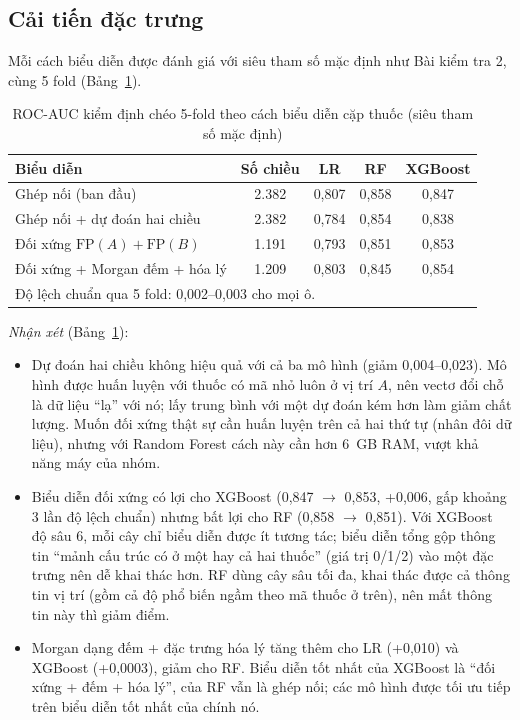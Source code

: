 \documentclass[12pt,a4paper,oneside]{report}
\begin{document}
\subsection{Cải tiến đặc trưng}
Mỗi cách biểu diễn được đánh giá với siêu tham số mặc định như Bài kiểm tra 2, cùng
5 fold (Bảng~\ref{tab:caitiendactrung}).

\begin{table}[H]
  \centering
  \caption{ROC-AUC kiểm định chéo 5-fold theo cách biểu diễn cặp thuốc (siêu tham số mặc định)}
  \label{tab:caitiendactrung}
  \small
  \begin{tabular}{lcccc}
    \toprule
    \textbf{Biểu diễn} & \textbf{Số chiều} & \textbf{LR} & \textbf{RF} & \textbf{XGBoost} \\
    \midrule
    Ghép nối (ban đầu) & 2.382 & 0,807 & 0,858 & 0,847 \\
    Ghép nối + dự đoán hai chiều & 2.382 & 0,784 & 0,854 & 0,838 \\
    Đối xứng $\mathrm{FP}(A)+\mathrm{FP}(B)$ & 1.191 & 0,793 & 0,851 & 0,853 \\
    Đối xứng + Morgan đếm + hóa lý & 1.209 & 0,803 & 0,845 & 0,854 \\
    \bottomrule
    \multicolumn{5}{l}{\footnotesize Độ lệch chuẩn qua 5 fold: 0,002--0,003 cho mọi ô.}
  \end{tabular}
\end{table}

\textit{Nhận xét} (Bảng~\ref{tab:caitiendactrung}):
\begin{itemize}
  \item Dự đoán hai chiều không hiệu quả với cả ba mô hình (giảm
        0,004--0,023). Mô hình được huấn luyện với thuốc có mã nhỏ luôn ở vị trí
        $A$, nên vectơ đổi chỗ là dữ liệu ``lạ'' với nó; lấy trung bình với một dự
        đoán kém hơn làm giảm chất lượng. Muốn đối xứng thật sự cần huấn luyện trên
        cả hai thứ tự (nhân đôi dữ liệu), nhưng với Random Forest cách này cần hơn
        6~GB RAM, vượt khả năng máy của nhóm.
  \item Biểu diễn đối xứng có lợi cho XGBoost (0,847 $\rightarrow$ 0,853,
        +0,006, gấp khoảng 3 lần độ lệch chuẩn) nhưng bất lợi cho RF
        (0,858 $\rightarrow$ 0,851). Với XGBoost độ sâu 6, mỗi cây chỉ biểu diễn
        được ít tương tác; biểu diễn tổng gộp thông tin ``mảnh cấu trúc có ở một
        hay cả hai thuốc'' (giá trị 0/1/2) vào một đặc trưng nên dễ khai thác hơn.
        RF dùng cây sâu tối đa, khai thác được cả thông tin vị trí (gồm cả độ phổ
        biến ngầm theo mã thuốc ở trên), nên mất thông tin này thì giảm điểm.
  \item Morgan dạng đếm + đặc trưng hóa lý tăng thêm cho LR (+0,010) và
        XGBoost (+0,0003), giảm cho RF. Biểu diễn tốt nhất của XGBoost là
        ``đối xứng + đếm + hóa lý'', của RF vẫn là ghép nối; các mô hình được tối
        ưu tiếp trên biểu diễn tốt nhất của chính nó.
\end{itemize}
\end{document}
